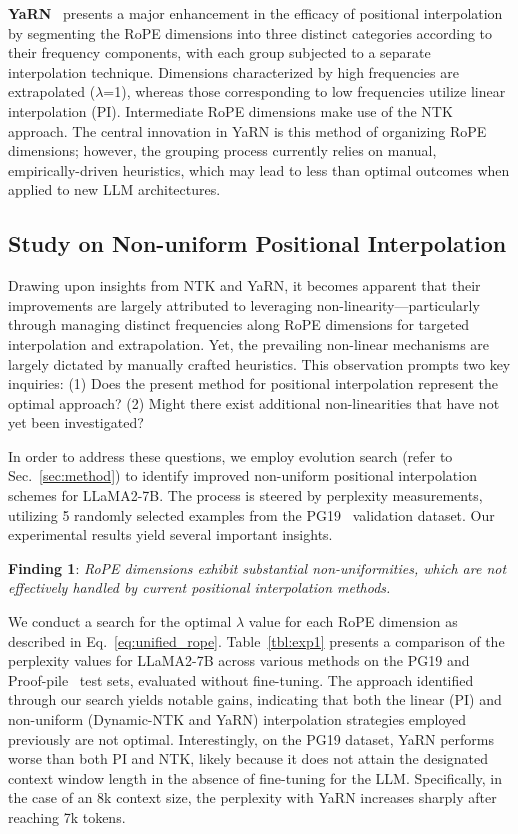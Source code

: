 \textbf{YaRN}~\cite{yarn} presents a major enhancement in the efficacy of positional interpolation by segmenting the RoPE dimensions into three distinct categories according to their frequency components, with each group subjected to a separate interpolation technique. Dimensions characterized by high frequencies are extrapolated ($\lambda$=1), whereas those corresponding to low frequencies utilize linear interpolation (PI). Intermediate RoPE dimensions make use of the NTK approach. The central innovation in YaRN is this method of organizing RoPE dimensions; however, the grouping process currently relies on manual, empirically-driven heuristics, which may lead to less than optimal outcomes when applied to new LLM architectures.

\subsection{Study on Non-uniform Positional Interpolation}

Drawing upon insights from NTK and YaRN, it becomes apparent that their improvements are largely attributed to leveraging non-linearity—particularly through managing distinct frequencies along RoPE dimensions for targeted interpolation and extrapolation. Yet, the prevailing non-linear mechanisms are largely dictated by manually crafted heuristics. This observation prompts two key inquiries: (1) Does the present method for positional interpolation represent the optimal approach? (2) Might there exist additional non-linearities that have not yet been investigated?

In order to address these questions, we employ evolution search (refer to Sec.~\ref{sec:method}) to identify improved non-uniform positional interpolation schemes for LLaMA2-7B. The process is steered by perplexity measurements, utilizing 5 randomly selected examples from the PG19~\cite{pg19} validation dataset. Our experimental results yield several important insights.

\textbf{Finding 1}: \textit{RoPE dimensions exhibit substantial non-uniformities, which are not effectively handled by current positional interpolation methods.}

We conduct a search for the optimal $\lambda$ value for each RoPE dimension as described in Eq.~\ref{eq:unified_rope}. Table~\ref{tbl:exp1} presents a comparison of the perplexity values for LLaMA2-7B across various methods on the PG19 and Proof-pile~\cite{proof-pile} test sets, evaluated without fine-tuning. The approach identified through our search yields notable gains, indicating that both the linear (PI) and non-uniform (Dynamic-NTK and YaRN) interpolation strategies employed previously are not optimal. Interestingly, on the PG19 dataset, YaRN performs worse than both PI and NTK, likely because it does not attain the designated context window length in the absence of fine-tuning for the LLM. Specifically, in the case of an 8k context size, the perplexity with YaRN increases sharply after reaching 7k tokens.


